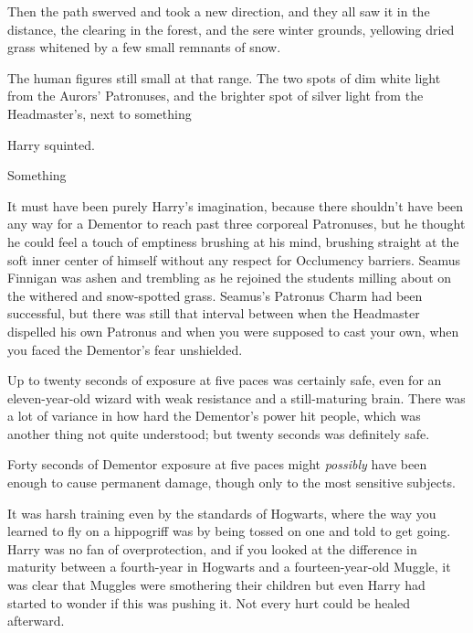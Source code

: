 Then the path swerved and took a new direction, and they all saw it in the
distance, the clearing in the forest, and the sere winter grounds, yellowing
dried grass whitened by a few small remnants of snow.

The human figures still small at that range. The two spots of dim white light
from the Aurors' Patronuses, and the brighter spot of silver light from the
Headmaster's, next to something{\el}

Harry squinted.

Something{\el}

It must have been purely Harry's imagination, because there shouldn't have been
any way for a Dementor to reach past three corporeal Patronuses, but he thought
he could feel a touch of emptiness brushing at his mind, brushing straight at
the soft inner center of himself without any respect for Occlumency barriers.
\sbreak
Seamus Finnigan was ashen and trembling as he rejoined the students milling
about on the withered and snow-spotted grass. Seamus's Patronus Charm had been
successful, but there was still that interval between when the Headmaster
dispelled his own Patronus and when you were supposed to cast your own, when
you faced the Dementor's fear unshielded.

Up to twenty seconds of exposure at five paces was certainly safe, even for an
eleven-year-old wizard with weak resistance and a still-maturing brain. There
was a lot of variance in how hard the Dementor's power hit people, which was
another thing not quite understood; but twenty seconds was definitely safe.

Forty seconds of Dementor exposure at five paces might \emph{possibly} have
been enough to cause permanent damage, though only to the most sensitive
subjects.

It was harsh training even by the standards of Hogwarts, where the way you
learned to fly on a hippogriff was by being tossed on one and told to get
going. Harry was no fan of overprotection, and if you looked at the
difference in maturity between a fourth-year in Hogwarts and a
fourteen-year-old Muggle, it was clear that Muggles were smothering their
children{\el} but even Harry had started to wonder if this was pushing it.
Not every hurt could be healed afterward.

